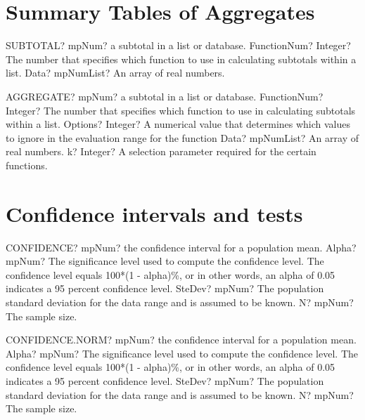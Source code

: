 \documentclass[12pt,a4paper,openany]{book}
\begin{document}
\section{Summary Tables of Aggregates}

\begin{mpFunctionsExtract}
\mpWorksheetFunctionTwoNotImplemented
{SUBTOTAL? mpNum? a subtotal in a list or database.}
{FunctionNum? Integer?  The number that specifies which function to use in calculating subtotals within a list.}
{Data? mpNumList? An array of real numbers.}
\end{mpFunctionsExtract}

\begin{mpFunctionsExtract}
\mpWorksheetFunctionFourNotImplemented
{AGGREGATE? mpNum? a subtotal in a list or database.}
{FunctionNum? Integer?  The number that specifies which function to use in calculating subtotals within a list.}
{Options? Integer?  A numerical value that determines which values to ignore in the evaluation range for the function}
{Data? mpNumList? An array of real numbers.}
{k? Integer?  A selection parameter required for the certain functions.}
\end{mpFunctionsExtract}

\section{Confidence intervals and tests}

\begin{mpFunctionsExtract}
\mpWorksheetFunctionThreeNotImplemented
{CONFIDENCE? mpNum? the confidence interval for a population mean.}
{Alpha? mpNum? The significance level used to compute the confidence level. The confidence level equals 100*(1 - alpha)\%, or in other words, an alpha of 0.05 indicates a 95 percent confidence level.
}
{SteDev? mpNum? The population standard deviation for the data range and is assumed to be known.}
{N? mpNum? The sample size.}
\end{mpFunctionsExtract}

\begin{mpFunctionsExtract}
\mpWorksheetFunctionThreeNotImplemented
{CONFIDENCE.NORM? mpNum? the confidence interval for a population mean.}
{Alpha? mpNum? The significance level used to compute the confidence level. The confidence level equals 100*(1 - alpha)\%, or in other words, an alpha of 0.05 indicates a 95 percent confidence level.
}
{SteDev? mpNum? The population standard deviation for the data range and is assumed to be known.}
{N? mpNum? The sample size.}
\end{mpFunctionsExtract}
\end{document}
